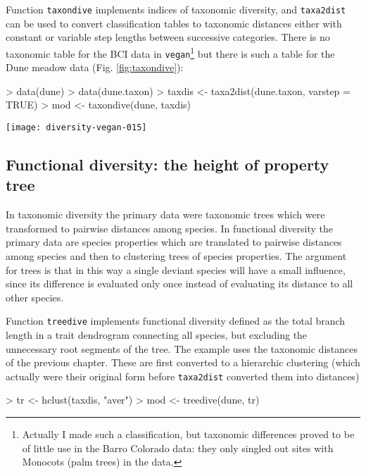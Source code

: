 \documentclass[a4paper,10pt]{amsart}
\begin{document}
Function \texttt{taxondive} implements indices of taxonomic diversity,
and \texttt{taxa2dist} can be used to convert classification tables to
taxonomic distances either with constant or variable step lengths
between successive categories. There is no taxonomic table for the BCI
data in \texttt{vegan}\footnote{Actually I made such a classification,
  but taxonomic differences proved to be of little use in the Barro
  Colorado data: they only singled out sites with Monocots (palm
  trees) in the data.}
but there is such a table for the Dune meadow data (Fig. \ref{fig:taxondive}):
\begin{Schunk}
\begin{Sinput}
> data(dune)
> data(dune.taxon)
> taxdis <- taxa2dist(dune.taxon, varstep = TRUE)
> mod <- taxondive(dune, taxdis)
\end{Sinput}
\end{Schunk}
\begin{SCfigure}
\texttt{[image: diversity-vegan-015]}
\caption{Taxonomic diversity $\Delta^+$ for the dune meadow data. The
  points are diversity values of single sites, and the funnel is their
  approximate confidence intervals ($2 \times$ standard error).}
\label{fig:taxondive}
\end{SCfigure}

\subsection{Functional diversity: the height of property tree}

In taxonomic diversity the primary data were taxonomic trees which
were transformed to pairwise distances among species. In functional
diversity the primary data are species properties which are translated
to pairwise distances among species and then to clustering trees of
species properties. The argument for trees is that in this way a
single deviant species will have a small influence, since its
difference is evaluated only once instead of evaluating its distance
to all other species.

Function \texttt{treedive} implements functional diversity defined as
the total branch length in a trait dendrogram connecting all species,
but excluding the unnecessary root segments of the tree.  The example
uses the taxonomic distances of the previous chapter. These are first
converted to a hierarchic clustering (which actually were their
original form before \texttt{taxa2dist} converted them into distances)
\begin{Schunk}
\begin{Sinput}
> tr <- hclust(taxdis, "aver")
> mod <- treedive(dune, tr)
\end{Sinput}
\end{Schunk}
\end{document}
